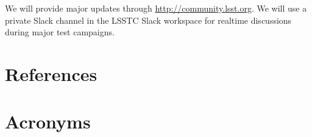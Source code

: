 \documentclass[DM,authoryear,toc]{lsstdoc}
\begin{document}
We will provide major updates through \url{http://community.lsst.org}. 
We will use a private Slack channel in the LSSTC Slack workspace for realtime discussions during major test campaigns.

\appendix
\section{References} \label{sec:bib}
\renewcommand{\refname}{} %


\section{Acronyms} \label{sec:acronyms}

\end{document}
